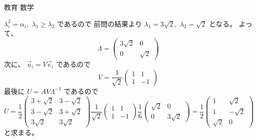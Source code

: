 \documentclass[fleqn]{jbook}
\begin{document}
\begin{answer}{教育 数学}{}
\begin{subanswers}
\begin{subsubanswers}
  \SubSubAnswer
    $\lambda_i^2 = \alpha_i,\,\,\lambda_1 \geq \lambda_2$ であるので
    前問の結果より $\lambda_1=3\sqrt{2},\,\,\lambda_2=\sqrt{2}$ となる。
    よって、
%
    \[ \Lambda = \begin{pmatrix}%
        3\sqrt{2} & 0 \\
        0 & \sqrt{2}  \end{pmatrix} \]
%
    次に、 $\vec{u}_i = V \vec{e}_i$ であるので
%
    \[ V = \frac{1}{\sqrt{2}} \begin{pmatrix}%
        1 &  1 \\
        1 & -1 \end{pmatrix} \]
%
    最後に $U = AV\Lambda^{-1}$ であるので
%
    \[ U = \frac{1}{2}\begin{pmatrix}%
          3+\sqrt{2} & 3-\sqrt{2} \\
          3-\sqrt{2} & 3+\sqrt{2} \\
          3\sqrt{2}  & 3\sqrt{2}  \end{pmatrix}%
        \frac{1}{\sqrt{2}}\begin{pmatrix}
          1 &  1 \\
          1 & -1 \end{pmatrix}%
        \frac{1}{6}\begin{pmatrix}%
          \sqrt{2} & 0 \\
          0 & 3\sqrt{2} \end{pmatrix}%
        = \frac{1}{2}\begin{pmatrix}
           1 &  \sqrt{2} \\
           1 & -\sqrt{2} \\
          \sqrt{2} & 0 \end{pmatrix} \]
%
    と求まる。
  \end{subsubanswers}


\end{subanswers}
\end{answer}
\end{document}
